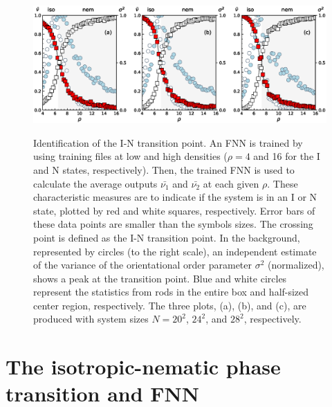 \begin{figure}[!t]
	\centering
	\begin{minipage}[t]{0.9\textwidth}
		{\includegraphics[width=\columnwidth]{./figs/FIG4.eps}}\\
	\end{minipage}%
	\caption{Identification of the I-N transition point. An FNN is trained by using training files at low and high densities ($\rho=4$ and 16 for the I and N states, respectively).
		Then, the trained FNN is used to calculate the average outputs $\bar{\nu_1}$ and $\bar{\nu_2}$ at each given $\rho$. These characteristic measures are to indicate if the system is in an I or N state, plotted by red and white squares, respectively.
		Error bars of these data points are smaller than the symbols sizes. The crossing point is defined as the I-N transition point. In the background, represented by circles (to the right scale), an independent estimate of the variance of the orientational order parameter $\sigma^2$ (normalized), shows a peak at the transition point. Blue and white circles represent the statistics from rods in the entire box and half-sized center region, respectively.
		The three plots, (a), (b), and (c), are produced with system sizes
		$N=20^2$, $24^2$, and $28^2$, respectively.
	}
	\label{fnn}
\end{figure}

\section{The isotropic-nematic phase transition and FNN}\label{IN}

